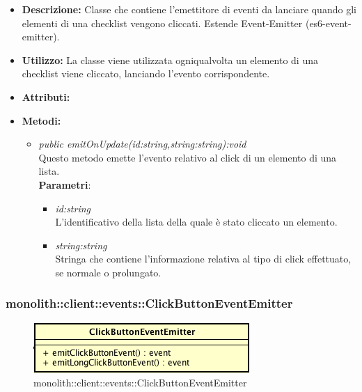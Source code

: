\begin{itemize}
\item \textbf{Descrizione:} Classe che contiene l'emettitore di eventi da lanciare quando gli elementi di una checklist vengono cliccati. Estende Event-Emitter (es6-event-emitter).
\item \textbf{Utilizzo:} La classe viene utilizzata ogniqualvolta un elemento di una checklist viene cliccato, lanciando l'evento corrispondente.
\item \textbf{Attributi:}
\item \textbf{Metodi:}
\begin{itemize}
\item \textit{public emitOnUpdate(id:string,string:string):void}\\
Questo metodo emette l'evento relativo al click di un elemento di una lista.
			\\ \textbf{Parametri}: \begin{itemize}
			\item \textit{id:string}\\
			L'identificativo della lista della quale è stato cliccato un elemento.
			\item \textit{string:string}\\
			Stringa che contiene l'informazione relativa al tipo di click effettuato, se normale o prolungato.
			\end{itemize} 
\end{itemize}
\end{itemize}

\subsubsection{monolith::client::events::ClickButtonEventEmitter}

\label{monolith::client::events::ClickButtonEventEmitter}
\begin{figure}[H]
	\centering
	\includegraphics[scale=0.5]{Sezioni/SottosezioniST/img/ClickButtonEventEmitter.png}
	\caption{monolith::client::events::ClickButtonEventEmitter}
\end{figure}

